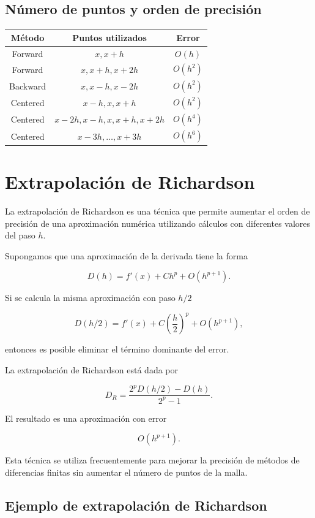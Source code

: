 \documentclass[12pt,a4paper]{article}
\theoremstyle{definition}
\theoremstyle{remark}
\begin{document}
\subsection{Número de puntos y orden de precisión}

\begin{center}
\begin{tabular}{ccc}
\hline
Método & Puntos utilizados & Error \\ \hline
Forward & $x,x+h$ & $O(h)$ \\
Forward & $x,x+h,x+2h$ & $O(h^2)$ \\
Backward & $x,x-h,x-2h$ & $O(h^2)$ \\
Centered & $x-h,x,x+h$ & $O(h^2)$ \\
Centered & $x-2h,x-h,x,x+h,x+2h$ & $O(h^4)$ \\
Centered & $x-3h,\dots,x+3h$ & $O(h^6)$ \\
\hline
\end{tabular}
\end{center}


\section{Extrapolación de Richardson}

La extrapolación de Richardson es una técnica que permite aumentar el orden
de precisión de una aproximación numérica utilizando cálculos con diferentes
valores del paso $h$.

Supongamos que una aproximación de la derivada tiene la forma

\[
D(h) = f'(x) + C h^p + O(h^{p+1}).
\]

Si se calcula la misma aproximación con paso $h/2$

\[
D(h/2) = f'(x) + C\left(\frac{h}{2}\right)^p + O(h^{p+1}),
\]

entonces es posible eliminar el término dominante del error.

La extrapolación de Richardson está dada por

\[
D_R =
\frac{2^p D(h/2)-D(h)}{2^p-1}.
\]

El resultado es una aproximación con error

\[
O(h^{p+1}).
\]

Esta técnica se utiliza frecuentemente para mejorar la precisión de métodos
de diferencias finitas sin aumentar el número de puntos de la malla.


\subsection{Ejemplo de extrapolación de Richardson}
\end{document}
